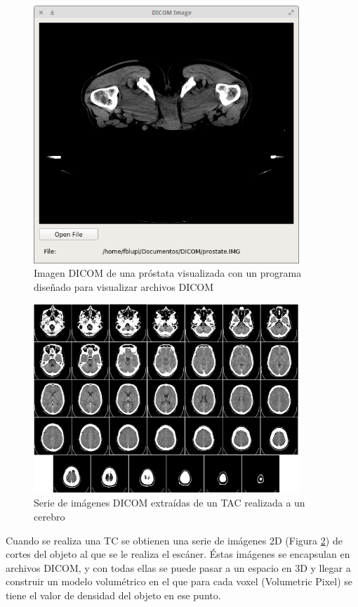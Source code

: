 \begin{figure}[H]
	\centering
	\includegraphics[width=10cm]{imagenes/prostate_dicom}
	\caption{Imagen DICOM de una próstata visualizada con un programa diseñado para visualizar archivos DICOM}
	\label{fig:prostate_dicom}
\end{figure}

\begin{figure}[H]
	\centering
	\includegraphics[width=10cm]{imagenes/brain_dicom_serie}
	\caption{Serie de imágenes DICOM extraídas de un TAC realizada a un cerebro}
	\label{fig:brain_dicom_serie}
\end{figure}

Cuando se realiza una TC se obtienen una serie de imágenes 2D (Figura \ref{fig:brain_dicom_serie}) de cortes del objeto al que se le realiza el escáner. Éstas imágenes se encapsulan en archivos DICOM, y con todas ellas se puede pasar a un espacio en 3D y llegar a construir un modelo volumétrico en el que para cada voxel (Volumetric Pixel) se tiene el valor de densidad del objeto en ese punto.


